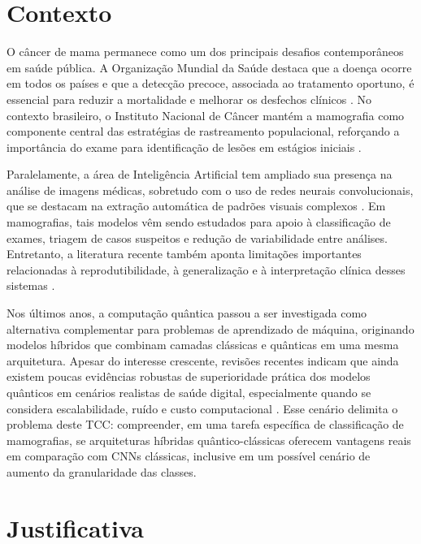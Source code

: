 \documentclass[
    12pt,
    openright,
    oneside,
    a4paper,
    english,
    brazil
]{abntex2}
\begin{document}
\chapter{Contexto}
\label{sec:contexto}

O câncer de mama permanece como um dos principais desafios contemporâneos em saúde pública. A Organização Mundial da Saúde destaca que a doença ocorre em todos os países e que a detecção precoce, associada ao tratamento oportuno, é essencial para reduzir a mortalidade e melhorar os desfechos clínicos \cite{WHO2025BreastCancer}. No contexto brasileiro, o Instituto Nacional de Câncer mantém a mamografia como componente central das estratégias de rastreamento populacional, reforçando a importância do exame para identificação de lesões em estágios iniciais \cite{INCA2025Rastreamento}.

Paralelamente, a área de Inteligência Artificial tem ampliado sua presença na análise de imagens médicas, sobretudo com o uso de redes neurais convolucionais, que se destacam na extração automática de padrões visuais complexos \cite{LeCun2015}. Em mamografias, tais modelos vêm sendo estudados para apoio à classificação de exames, triagem de casos suspeitos e redução de variabilidade entre análises. Entretanto, a literatura recente também aponta limitações importantes relacionadas à reprodutibilidade, à generalização e à interpretação clínica desses sistemas \cite{Bhalla2023MammographyReview}.

Nos últimos anos, a computação quântica passou a ser investigada como alternativa complementar para problemas de aprendizado de máquina, originando modelos híbridos que combinam camadas clássicas e quânticas em uma mesma arquitetura. Apesar do interesse crescente, revisões recentes indicam que ainda existem poucas evidências robustas de superioridade prática dos modelos quânticos em cenários realistas de saúde digital, especialmente quando se considera escalabilidade, ruído e custo computacional \cite{Gupta2025QMLDigitalHealth}. Esse cenário delimita o problema deste TCC: compreender, em uma tarefa específica de classificação de mamografias, se arquiteturas híbridas quântico-clássicas oferecem vantagens reais em comparação com CNNs clássicas, inclusive em um possível cenário de aumento da granularidade das classes.

\chapter{Justificativa}
\label{sec:justificativa}
\end{document}
